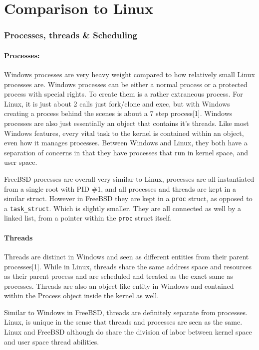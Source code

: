 \documentclass{article}
\begin{document}
\part{Comparison to Linux}
\section{Processes, threads \& Scheduling}
\subsection{Processes:}
    Windows processes are very heavy weight compared to how relatively small Linux processes are. Windows processes can be either a normal process or a protected process with special rights. To create them is a rather extraneous process. For Linux, it is just about 2 calls just fork/clone and exec, but with Windows creating a process behind the scenes is about a 7 step process[1]. Windows processes are also just essentially an object that contains it’s threads. Like most Windows features, every vital task to the kernel is contained within an object, even how it manages processes. Between Windows and Linux, they both have a separation of concerns in that they have processes that run in kernel space, and user space.

    FreeBSD processes are overall very similar to Linux, processes are all instantiated from a single root with PID \#1, and all processes and threads are kept in a similar struct. However in FreeBSD they are kept in a \texttt{proc} struct, as opposed to a \texttt{task\_struct}. Which is slightly smaller. They are all connected as well by a linked list, from a pointer within the \texttt{proc} struct itself.

\subsection{Threads}
	Threads are distinct in Windows and seen as different entities from their parent processes[1]. While in Linux, threads share the same address space and resources as their parent process and are scheduled and treated as the exact same as processes. Threads are also an object like entity in Windows and contained within the Process object inside the kernel as well.

	Similar to Windows in FreeBSD, threads are definitely separate from processes. Linux, is unique in the sense that threads and processes are seen as the same. Linux and FreeBSD although do share the division of labor between kernel space and user space thread abilities.\newline
\end{document}
